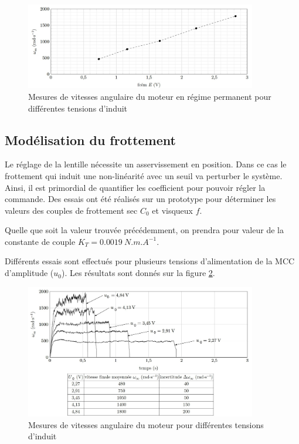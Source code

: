 \begin{figure}[!htb]
\begin{center}
\includegraphics[width=0.9\textwidth]{images/image_fig12.jpg}
\caption{Mesures de vitesses angulaire du moteur en régime permanent pour différentes tensions d’induit \label{fig12}}
\end{center}
\end{figure}

\subsection{Modélisation du frottement}

Le réglage de la lentille nécessite un asservissement en position. Dans ce cas le frottement qui induit une non-linéarité avec un seuil va perturber le système. Ainsi, il est primordial de quantifier les coefficient pour pouvoir
régler la commande. Des essais ont été réalisés sur un prototype pour déterminer les valeurs des couples de
frottement sec $C_0$ et visqueux $f$.

Quelle que soit la valeur trouvée précédemment, on prendra pour valeur de la constante de couple $K_T= \SI{0,0019}{N. m. A^{-1}}$.

Différents essais sont effectués pour plusieurs tensions d'alimentation de la MCC d'amplitude ($u_0$). Les résultats sont donnés sur
la figure \ref{fig13}.

\begin{figure}[!htb]
\begin{center}
\includegraphics[width=0.9\textwidth]{images/image_fig13.jpg}
\caption{Mesures de vitesses angulaire du moteur pour différentes tensions d’induit \label{fig13}}
\end{center}
\end{figure}

